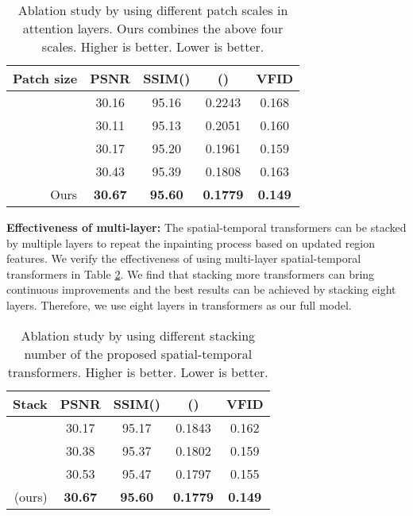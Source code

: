 \documentclass[runningheads]{llncs}
\begin{document}
\begin{table}
   \begin{center}
   \begin{tabular}{r|c|c|c|c} 
      Patch size &PSNR &SSIM() & () &VFID \\\hline \hline
      &30.16  &95.16 &0.2243 &0.168 \\\hline 
      &30.11  &95.13 &0.2051 &0.160 \\\hline 
      &30.17  &95.20 &0.1961 &0.159 \\\hline 
        &30.43  &95.39 &0.1808 &0.163 \\\hline 
    Ours &\textbf{30.67} &\textbf{95.60} &\textbf{0.1779} &\textbf{0.149} \\\hline
   \end{tabular} 
\end{center}
   \caption{Ablation study by using different patch scales in attention layers. Ours combines the above four scales.  Higher is better.  Lower is better.}
   \label{tb:ab-size}
\end{table}


\textbf{Effectiveness of multi-layer:}
The spatial-temporal transformers can be stacked by multiple layers to repeat the inpainting process based on updated region features. We verify the effectiveness of using multi-layer spatial-temporal transformers in Table \ref{tb:ab-stack}. 
We find that stacking more transformers can bring continuous improvements and the best results can be achieved by stacking eight layers. Therefore, we use eight layers in transformers as our full model. 


\begin{table}
   \begin{center}
   \begin{tabular}{r|c|c|c|c} 
     Stack  &PSNR &SSIM() & () &VFID \\\hline \hline
        &30.17 &95.17 &0.1843 &0.162 \\\hline 
       &30.38 &95.37 &0.1802 &0.159 \\\hline 
      &30.53 &95.47 &0.1797 &0.155 \\\hline 
     (ours) &\textbf{30.67} &\textbf{95.60} &\textbf{0.1779} &\textbf{0.149} \\\hline 
   \end{tabular} 
\end{center}
   \caption{Ablation study by using different stacking number of the proposed spatial-temporal transformers.  Higher is better.  Lower is better.}
   \label{tb:ab-stack}
\end{table}
\end{document}
